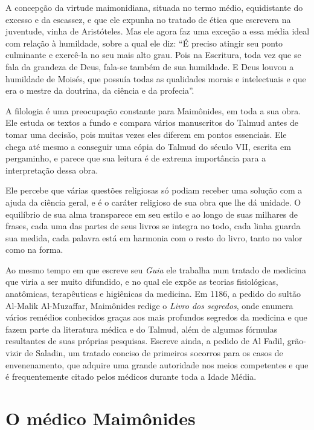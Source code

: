 A concepção da virtude maimonidiana, situada no termo médio,
equidistante do excesso e da escassez, e que ele expunha no tratado de
ética que escrevera na juventude, vinha de Aristóteles. Mas ele agora
faz uma exceção a essa média ideal com relação à humildade, sobre a qual
ele diz: ``É preciso atingir seu ponto culminante e exercê-la no seu
mais alto grau. Pois na Escritura, toda vez que se fala da grandeza de
Deus, fala-se também de sua humildade. E Deus louvou a humildade de
Moisés, que possuía todas as qualidades morais e intelectuais e que era
o mestre da doutrina, da ciência e da profecia''.

A filologia é uma preocupação constante para Maimônides, em toda a sua
obra. Ele estuda os textos a fundo e compara vários manuscritos do
Talmud antes de tomar uma decisão, pois muitas vezes eles diferem
em pontos essenciais. Ele chega até mesmo a conseguir uma cópia do
Talmud do século VII, escrita em pergaminho, e parece que sua
leitura é de extrema importância para a interpretação dessa obra.

Ele percebe que várias questões religiosas só podiam receber uma solução
com a ajuda da ciência geral, e é o caráter religioso de sua obra que
lhe dá unidade. O equilíbrio de sua alma transparece em seu estilo e ao
longo de suas milhares de frases, cada uma das partes de seus livros se
integra no todo, cada linha guarda sua medida, cada palavra está em
harmonia com o resto do livro, tanto no valor como na forma.

Ao mesmo tempo em que escreve seu \emph{Guia} ele trabalha num tratado
de medicina que viria a ser muito difundido, e no qual ele expõe as
teorias fisiológicas, anatômicas, terapêuticas e higiênicas da medicina.
Em 1186, a pedido do sultão Al-Malik Al-Muzaffar, Maimônides redige o
\emph{Livro dos segredos}, onde enumera vários remédios conhecidos
graças aos mais profundos segredos da medicina e que fazem parte da
literatura médica e do Talmud, além de algumas fórmulas
resultantes de suas próprias pesquisas. Escreve ainda, a pedido de Al
Fadil, grão-vizir de Saladin, um tratado conciso de primeiros socorros
para os casos de envenenamento, que adquire uma grande autoridade nos
meios competentes e que é frequentemente citado pelos médicos durante
toda a Idade Média.

\section{O médico Maimônides}

